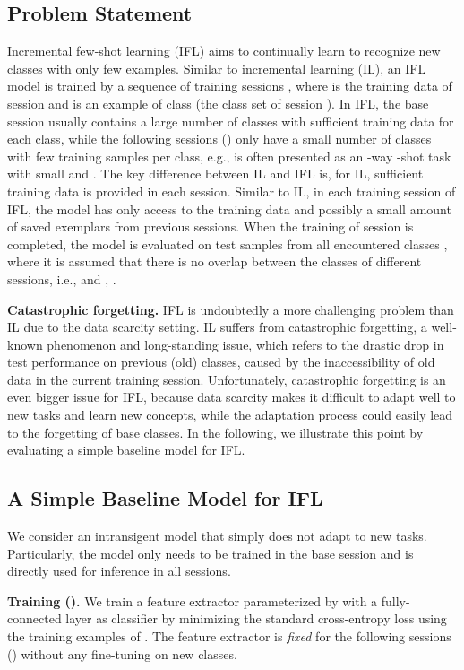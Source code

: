 \documentclass{article}
\begin{document}
\subsection{Problem Statement}
Incremental few-shot learning (IFL) aims to continually learn to recognize new classes with only few examples. Similar to incremental learning (IL), an IFL model is trained by a sequence of training sessions , where   is the training data of session  and   is an example of class  (the class set of session ). In IFL, the base session  usually contains a large number of classes with sufficient training data for each class, while the following sessions () only have a small number of classes with few training samples per class, e.g.,  is often presented as an -way -shot task with small  and . The key difference between IL and IFL is, for IL, sufficient training data is provided in each session. Similar to IL, in each training session  of IFL, the model has only access to the training data  and possibly a small amount of saved exemplars from previous sessions. When the training of session  is completed, the model is evaluated on test samples from all encountered classes , where it is assumed that there is no overlap between the classes of different sessions, i.e.,  and , . 

\textbf{Catastrophic forgetting.} IFL is undoubtedly a more challenging problem than IL due to the data scarcity setting. IL suffers from catastrophic forgetting, a well-known phenomenon and long-standing issue, which refers to the drastic drop in test performance on previous (old) classes, caused by the inaccessibility of old data in the current training session. Unfortunately, catastrophic forgetting is an even bigger issue for IFL, because data scarcity makes it difficult to adapt well to new tasks and learn new concepts, while the adaptation process could easily lead to the forgetting of base classes. In the following, we illustrate this point by evaluating a simple baseline model for IFL.

\subsection{A Simple Baseline Model for IFL}

We consider an intransigent model that simply does not adapt to new tasks. Particularly, the model only needs to be trained in the base session  and is directly used for inference in all sessions. 

\textbf{Training ().} We train a feature extractor  parameterized by  with a fully-connected layer as classifier by minimizing the standard cross-entropy loss using the training examples of . The feature extractor  is \textit{fixed} for the following sessions () without any fine-tuning on new classes. 
\end{document}
